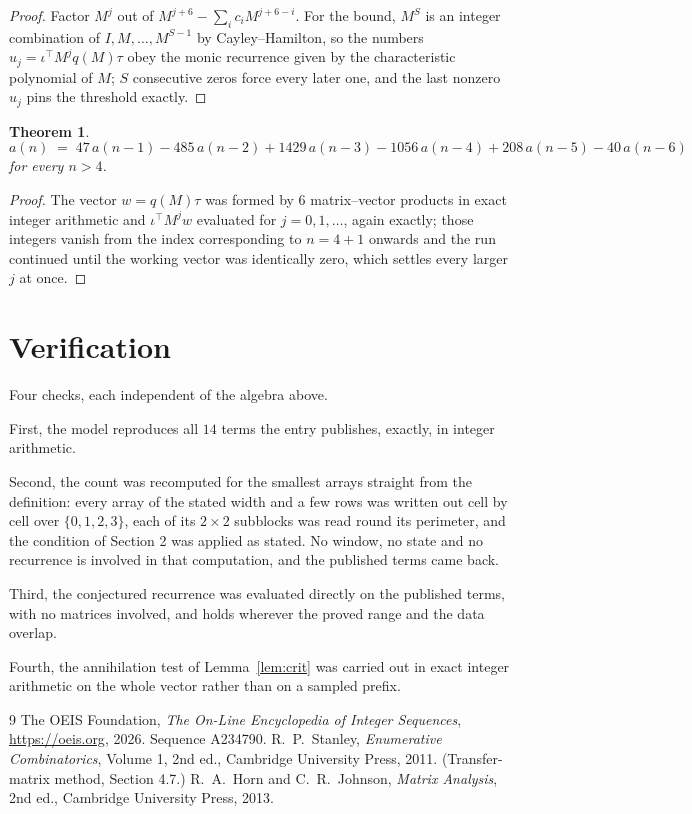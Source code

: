 \documentclass[11pt,a4paper]{article}
\theoremstyle{plain}
\newtheorem{theorem}{Theorem}
\theoremstyle{definition}
\begin{document}
\begin{proof}
Factor $M^{j}$ out of $M^{j+6}-\sum_ic_iM^{j+6-i}$. For the bound, $M^{S}$
is an integer combination of $I,M,\dots,M^{S-1}$ by Cayley--Hamilton, so the numbers
$u_j=\iota^{\!\top}M^{j}q(M)\tau$ obey the monic recurrence given by the characteristic
polynomial of $M$; $S$ consecutive zeros force every later one, and the last nonzero $u_j$
pins the threshold exactly.
\end{proof}

\begin{theorem}
\[
a(n)\;=\;47\,a(n-1) - 485\,a(n-2) + 1429\,a(n-3) - 1056\,a(n-4) + 208\,a(n-5) - 40\,a(n-6)
\]
for every $n>4$.
\end{theorem}

\begin{proof}
The vector $w=q(M)\tau$ was formed by $6$ matrix--vector products in exact integer
arithmetic and $\iota^{\!\top}M^{j}w$ evaluated for $j=0,1,\dots$, again exactly; those
integers vanish from the index corresponding to $n=4+1$ onwards and the run continued
until the working vector was identically zero, which settles every larger $j$ at once.
\end{proof}

\section{Verification}

Four checks, each independent of the algebra above.

First, the model reproduces all $14$ terms the entry publishes, exactly, in integer
arithmetic.

Second, the count was recomputed for the smallest arrays straight from the definition: every
array of the stated width and a few rows was written out cell by cell over $\{0,1,2,3\}$, each of
its $2\times2$ subblocks was read round its perimeter, and the condition of Section 2 was
applied as stated. No window, no state and no recurrence is involved in that computation, and
the published terms came back.

Third, the conjectured recurrence was evaluated directly on the published terms, with no
matrices involved, and holds wherever the proved range and the data overlap.

Fourth, the annihilation test of Lemma~\ref{lem:crit} was carried out in exact integer
arithmetic on the whole vector rather than on a sampled prefix.

\begin{thebibliography}{9}
 The OEIS Foundation, \emph{The On-Line Encyclopedia of Integer
Sequences}, \url{https://oeis.org}, 2026. Sequence A234790.
 R.~P.~Stanley, \emph{Enumerative Combinatorics}, Volume 1, 2nd ed.,
Cambridge University Press, 2011. (Transfer-matrix method, Section 4.7.)
 R.~A.~Horn and C.~R.~Johnson, \emph{Matrix Analysis}, 2nd ed., Cambridge
University Press, 2013.
\end{thebibliography}
\end{document}
